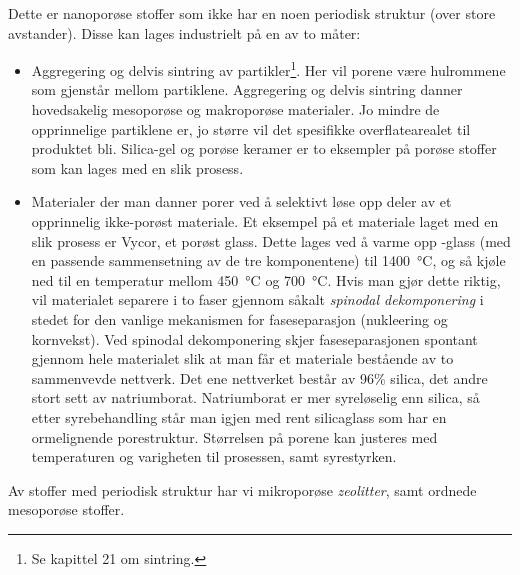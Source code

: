 Dette er nanoporøse stoffer som ikke har en noen periodisk struktur (over store avstander). Disse kan lages industrielt på en av to måter:
\begin{itemize}
	\item Aggregering og delvis sintring av partikler\footnote{Se kapittel 21 om sintring.}. Her vil porene være hulrommene som gjenstår mellom partiklene. Aggregering og delvis sintring danner hovedsakelig mesoporøse og makroporøse materialer. Jo mindre de opprinnelige partiklene er, jo større vil det spesifikke overflatearealet til produktet bli. Silica-gel og porøse keramer er to eksempler på porøse stoffer som kan lages med en slik prosess.
	\item Materialer der man danner porer ved å selektivt løse opp deler av et opprinnelig ikke-porøst materiale. Et eksempel på et materiale laget med en slik prosess er Vycor, et porøst glass. Dette lages ved å varme opp -glass (med en passende sammensetning av de tre komponentene) til \SI{1400}{\celsius}, og så kjøle ned til en temperatur mellom \SI{450}{\celsius} og \SI{700}{\celsius}. Hvis man gjør dette riktig, vil materialet separere i to faser gjennom såkalt \emph{spinodal dekomponering} i stedet for den vanlige mekanismen for faseseparasjon (nukleering og kornvekst). Ved spinodal dekomponering skjer faseseparasjonen spontant gjennom hele materialet slik at man får et materiale bestående av to sammenvevde nettverk. Det ene nettverket består av 96\% silica, det andre stort sett av natriumborat. Natriumborat er mer syreløselig enn silica, så etter syrebehandling står man igjen med rent silicaglass som har en ormelignende porestruktur. Størrelsen på porene kan justeres med temperaturen og varigheten til prosessen, samt syrestyrken.
\end{itemize}

Av stoffer med periodisk struktur har vi mikroporøse \emph{zeolitter}, samt ordnede mesoporøse stoffer. 

